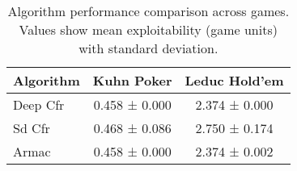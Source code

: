 \begin{table}[h]
\centering
\caption{Algorithm performance comparison across games. Values show mean exploitability (game units) with standard deviation.}
\label{tab:performance_comparison}
\begin{tabular}{lcc}
\toprule
Algorithm & Kuhn Poker & Leduc Hold'em \\
\midrule
Deep Cfr & 0.458 ± 0.000 & 2.374 ± 0.000 \\
Sd Cfr & 0.468 ± 0.086 & 2.750 ± 0.174 \\
Armac & 0.458 ± 0.000 & 2.374 ± 0.002 \\
\bottomrule
\end{tabular}
\end{table}